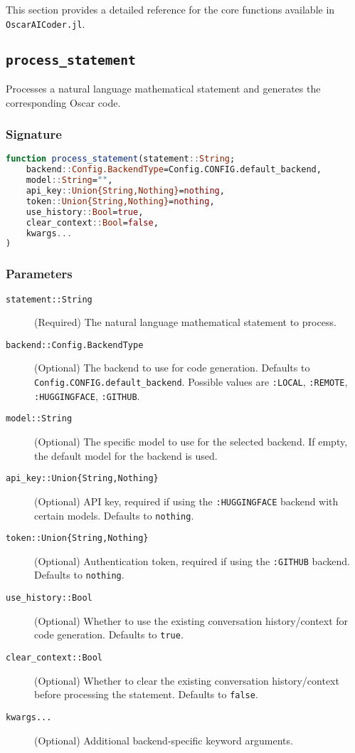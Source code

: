 \documentclass[11pt,a4paper]{article}
\newcommand{\code}[1]{\texttt{#1}}
\newcommand{\func}[1]{\texttt{#1}}
\newcommand{\modname}[1]{\texttt{#1}}
\providecommand{\code}[1]{\texttt{\color{blue!70!black}#1}}
\begin{document}
This section provides a detailed reference for the core functions available in \modname{OscarAICoder.jl}.

\subsection{\func{process\_statement}}
\label{func:process_statement}

Processes a natural language mathematical statement and generates the corresponding Oscar code.

\subsubsection*{Signature}
\begin{lstlisting}[language=Julia]
function process_statement(statement::String; 
    backend::Config.BackendType=Config.CONFIG.default_backend,
    model::String="",
    api_key::Union{String,Nothing}=nothing,
    token::Union{String,Nothing}=nothing,
    use_history::Bool=true,
    clear_context::Bool=false,
    kwargs...
)
\end{lstlisting}

\subsubsection*{Parameters}
\begin{description}
    \item[\code{statement::String}] (Required) The natural language mathematical statement to process.
    \item[\code{backend::Config.BackendType}] (Optional) The backend to use for code generation. Defaults to \code{Config.CONFIG.default\_backend}. Possible values are \code{:LOCAL}, \code{:REMOTE}, \code{:HUGGINGFACE}, \code{:GITHUB}.
    \item[\code{model::String}] (Optional) The specific model to use for the selected backend. If empty, the default model for the backend is used.
    \item[\code{api\_key::Union\{String,Nothing\}}] (Optional) API key, required if using the \code{:HUGGINGFACE} backend with certain models. Defaults to \code{nothing}.
    \item[\code{token::Union\{String,Nothing\}}] (Optional) Authentication token, required if using the \code{:GITHUB} backend. Defaults to \code{nothing}.
    \item[\code{use\_history::Bool}] (Optional) Whether to use the existing conversation history/context for code generation. Defaults to \code{true}.
    \item[\code{clear\_context::Bool}] (Optional) Whether to clear the existing conversation history/context before processing the statement. Defaults to \code{false}.
    \item[\code{kwargs...}] (Optional) Additional backend-specific keyword arguments.
\end{description}
\end{document}
